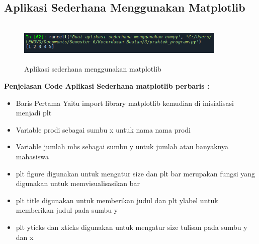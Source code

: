 \subsection{Aplikasi Sederhana Menggunakan Matplotlib}
\begin{figure}[!htbp]
    \centering
    \includegraphics[width=10cm,height=2cm]{figures/Cp3-2.png}
    \caption{Aplikasi sederhana menggunakan matplotlib}
    \label{penanda}
\end{figure}
\textbf{Penjelasan Code Aplikasi Sederhana matplotlib perbaris :}
\begin{itemize}
    \item Baris Pertama Yaitu import library matplotlib kemudian di inisialisasi menjadi plt
    \item Variable prodi sebagai sumbu x untuk nama nama prodi
    \item Variable jumlah mhs sebagai sumbu y untuk jumlah atau banyaknya mahasiswa
    \item plt figure digunakan untuk mengatur size dan plt bar merupakan fungsi yang digunakan untuk memvisualisasikan bar
    \item plt title digunakan untuk memberikan judul dan plt ylabel untuk memberikan judul pada sumbu y
    \item plt yticks dan xticks digunakan untuk mengatur size tulisan pada sumbu y dan x
\end{itemize}

